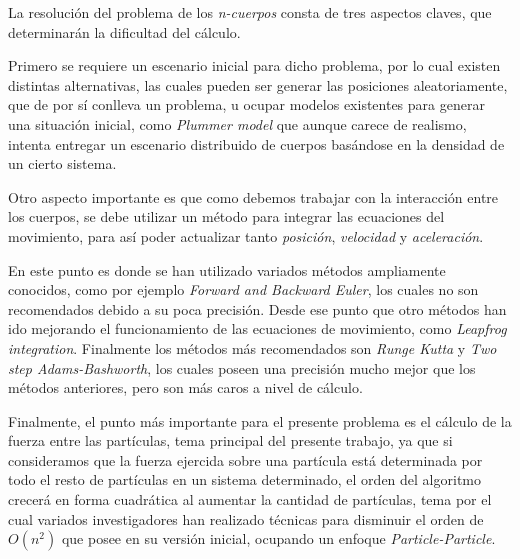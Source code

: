 
La resolución del problema de los \emph{n-cuerpos} consta de tres
aspectos claves, que determinarán la dificultad del cálculo.

Primero se requiere un escenario inicial para dicho problema,
por lo cual existen distintas alternativas, las cuales pueden ser
generar las posiciones aleatoriamente, que de por sí conlleva un problema,
u ocupar modelos existentes para generar una situación inicial,
como \emph{Plummer model} que aunque carece de realismo,
intenta entregar un escenario distribuido de cuerpos
basándose en la densidad de un cierto sistema.

Otro aspecto importante es que como debemos trabajar con la interacción
entre los cuerpos, se debe utilizar un método para integrar las ecuaciones
del movimiento, para así poder actualizar tanto \emph{posición}, \emph{velocidad}
y \emph{aceleración}. 

En este punto es donde se han utilizado variados métodos ampliamente conocidos,
como por ejemplo \emph{Forward and Backward Euler}, los cuales no son recomendados
debido a su poca precisión. Desde ese punto que otro métodos han ido mejorando
el funcionamiento de las ecuaciones de movimiento, como \emph{Leapfrog integration}.
Finalmente los métodos más recomendados son \emph{Runge Kutta} y \emph{Two step Adams-Bashworth},
los cuales poseen una precisión mucho mejor que los métodos anteriores, pero son
más caros a nivel de cálculo.

Finalmente, el punto más importante para el presente problema es el cálculo
de la fuerza entre las partículas, tema principal del presente trabajo,
ya que si consideramos que la fuerza ejercida sobre una partícula está determinada
por todo el resto de partículas en un sistema determinado, el orden del algoritmo
crecerá en forma cuadrática al aumentar la cantidad de partículas,
tema por el cual variados investigadores han realizado técnicas para disminuir
el orden de $O(n^2)$ que posee en su versión inicial, ocupando un enfoque
\emph{Particle-Particle}.
